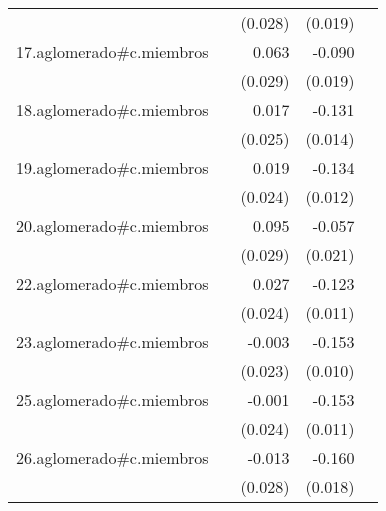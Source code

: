 {\begin{longtable}{l*{4}{D{.}{.}{-1}}}
            &                     &     (0.028)         &     (0.019)         &                     \\
\addlinespace
17.aglomerado#c.miembros&                     &       0.063\sym{*}  &      -0.090\sym{***}&                     \\
            &                     &     (0.029)         &     (0.019)         &                     \\
\addlinespace
18.aglomerado#c.miembros&                     &       0.017         &      -0.131\sym{***}&                     \\
            &                     &     (0.025)         &     (0.014)         &                     \\
\addlinespace
19.aglomerado#c.miembros&                     &       0.019         &      -0.134\sym{***}&                     \\
            &                     &     (0.024)         &     (0.012)         &                     \\
\addlinespace
20.aglomerado#c.miembros&                     &       0.095\sym{**} &      -0.057\sym{**} &                     \\
            &                     &     (0.029)         &     (0.021)         &                     \\
\addlinespace
22.aglomerado#c.miembros&                     &       0.027         &      -0.123\sym{***}&                     \\
            &                     &     (0.024)         &     (0.011)         &                     \\
\addlinespace
23.aglomerado#c.miembros&                     &      -0.003         &      -0.153\sym{***}&                     \\
            &                     &     (0.023)         &     (0.010)         &                     \\
\addlinespace
25.aglomerado#c.miembros&                     &      -0.001         &      -0.153\sym{***}&                     \\
            &                     &     (0.024)         &     (0.011)         &                     \\
\addlinespace
26.aglomerado#c.miembros&                     &      -0.013         &      -0.160\sym{***}&                     \\
            &                     &     (0.028)         &     (0.018)         &                     \\

\end{longtable}}

